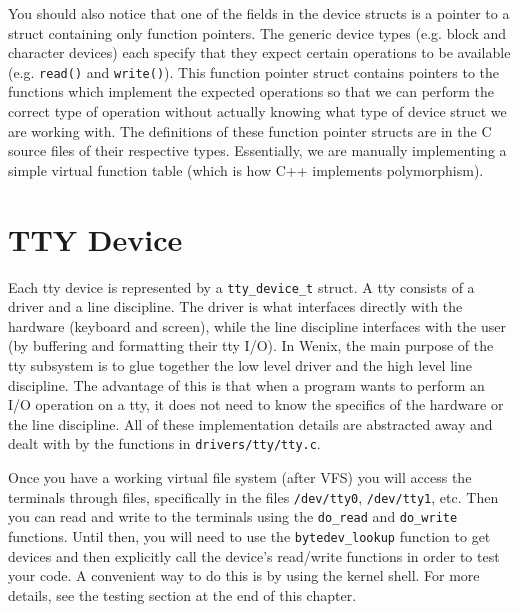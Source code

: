 You should also notice that one of the fields in the device structs is a pointer to a struct containing only function pointers. The generic device types (e.g. block and character devices) each specify that they expect certain operations to be available (e.g. \texttt{read()} and \texttt{write()}). This function pointer struct contains pointers to the functions which implement the expected operations so that we can perform the correct type of operation without actually knowing what type of device struct we are working with. The definitions of these function pointer structs are in the C source files of their respective types. Essentially, we are manually implementing a simple virtual function table (which is how C++ implements polymorphism). 

\section{TTY Device}

Each tty device is represented by a \texttt{tty\_device\_t} struct. A tty consists of a driver and a line discipline. The driver is what interfaces directly with the hardware (keyboard and screen), while the line discipline interfaces with the user (by buffering and formatting their tty I/O). In Wenix, the main purpose of the tty subsystem is to glue together the low level driver and the high level line discipline. The advantage of this is that when a program wants to perform an I/O operation on a tty, it does not need to know the specifics of the hardware or the line discipline. All of these implementation details are abstracted away and dealt with by the functions in \texttt{drivers/tty/tty.c}.

Once you have a working virtual file system (after VFS) you will access the terminals through files, specifically in the files \texttt{/dev/tty0}, \texttt{/dev/tty1}, etc. Then you can read and write to the terminals using the \texttt{do\_read} and \texttt{do\_write} functions. Until then, you will need to use the \texttt{bytedev\_lookup} function to get devices and then explicitly call the device's read/write functions in order to test your code. A convenient way to do this is by using the kernel shell. For more details, see the testing section at the end of this chapter. 

